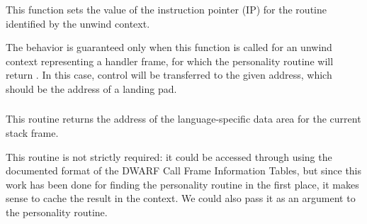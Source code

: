 \subsubsection{}

This function sets the value of the instruction pointer (IP) for the
routine identified by the unwind context.

The behavior is guaranteed only when this function is called for an
unwind context representing a handler frame, for which the personality
routine will return . In this case, control will
be transferred to the given address, which should be the address of a
landing pad.

\subsubsection{}


\begin{sloppypar}
This routine returns the address of the language-specific data area for
the current stack frame.

This routine is not strictly required: it could be accessed through
 using the documented format of the DWARF Call Frame
Information Tables, but since this work has been done for finding the
personality routine in the first place, it makes sense to cache the
result in the context.
We could also pass it as an argument to the personality routine.
\end{sloppypar}

\subsubsection{}


